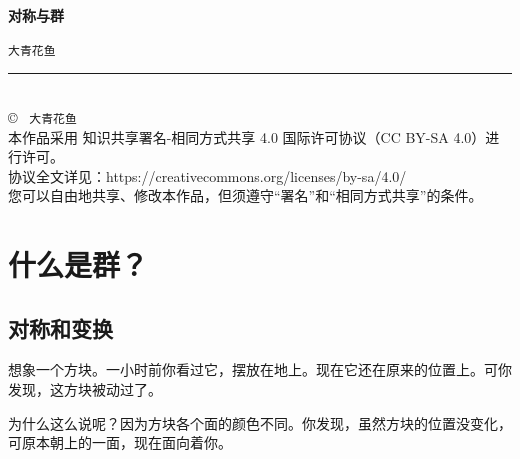 \documentclass[12pt,UTF8,fontset=none]{ctexbook}
\newcommand{\mytitle}{对称与群}
\newcommand{\myauthor}{大青花鱼}
\begin{document}
\cleardoublepage                %
\thispagestyle{empty}           %
\begin{center}
    \vspace*{2cm}               %
    
    { \bfseries \mytitle}
    
    \vspace{1cm}              %
    
    { \texttt{\myauthor}}
    
    \vfill                      %
    
    \rule{0.5\textwidth}{0.4pt} \\[0.5cm]
    
    {\scriptsize
    \copyright\ \the\year{} \texttt{\myauthor} \\[0.2cm]
    本作品采用 知识共享署名-相同方式共享 4.0 国际许可协议（CC BY-SA 4.0）进行许可。\\
    协议全文详见：https://creativecommons.org/licenses/by-sa/4.0/ \\
    您可以自由地共享、修改本作品，但须遵守“署名”和“相同方式共享”的条件。
    }
\end{center}
\newpage   

\tableofcontents
\newpage

\chapter{什么是群？}

\section{对称和变换}

想象一个方块。一小时前你看过它，摆放在地上。现在它还在原来的位置上。可你发现，这方块被动过了。

为什么这么说呢？因为方块各个面的颜色不同。你发现，虽然方块的位置没变化，可原本朝上的一面，现在面向着你。
\end{document}
